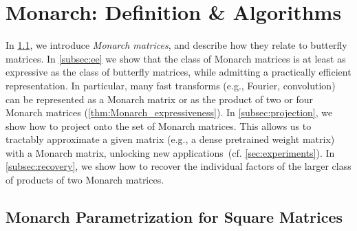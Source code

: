 
\section{Monarch: Definition \& Algorithms}
\label{sec:theory}

In \cref{subsec:parametrization}, we introduce \emph{Monarch matrices},
and describe how they relate to butterfly matrices. In \cref{subsec:ee} we show that the class of Monarch matrices is at least as expressive as the class of butterfly matrices,
while admitting a practically efficient representation.
In particular, many fast transforms (e.g., Fourier, convolution) can be represented as a Monarch matrix or as the product of two or four Monarch matrices (\cref{thm:Monarch_expressiveness}).
In \cref{subsec:projection}, we show how to project onto the set of Monarch
matrices. This allows us to tractably approximate a given matrix
(e.g., a dense pretrained weight matrix) with a Monarch matrix, unlocking new applications~(cf. \cref{sec:experiments}).
In \cref{subsec:recovery}, we show how to recover the individual factors of the
larger class of products of two Monarch matrices.

\subsection{Monarch Parametrization for Square Matrices}
\label{subsec:parametrization}

